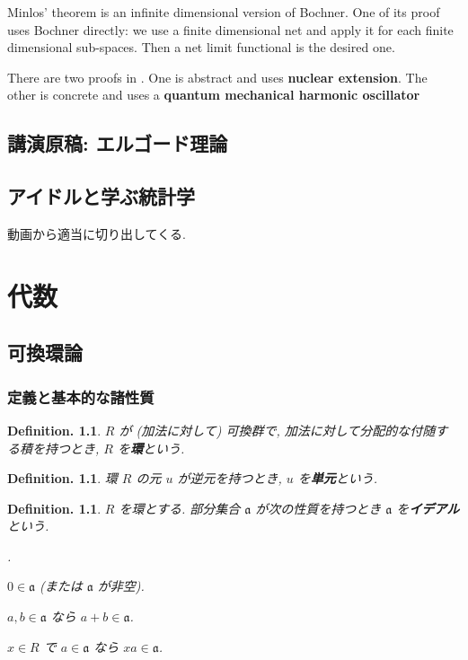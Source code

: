 \documentclass[openany, a4paper, oneside]{jsbook}
\newcounter{enum2}
\renewenvironment{enumerate}{%
\begin{list}%
{%
\arabic{enum2}.\ \,%
}%
{%
\usecounter{enum2}
\setlength{\itemindent}{0pt}%
\setlength{\leftmargin}{15pt}%
\setlength{\rightmargin}{0pt}%
\setlength{\labelsep}{0pt}%
\setlength{\labelwidth}{6pt}%
\setlength{\itemsep}{0pt}%
\setlength{\parsep}{0pt}%
\setlength{\listparindent}{0pt}%
}
}{%
\end{list}%
}
\theoremstyle{break}
\theoremstyle{breakdefn}
\newtheorem{defn}[thm]{Definition.}
\newcommand{\fraka}{\mathfrak{a}}
\begin{document}
Minlos' theorem is an infinite dimensional version of Bochner.
One of its proof uses Bochner directly: we use a finite dimensional net and apply it for each finite dimensional sub-spaces.
Then a net limit functional is the desired one.

There are two proofs in \cite{AsaoArai5}.
One is abstract and uses \textbf{nuclear extension}.
The other is concrete and uses a \textbf{quantum mechanical harmonic oscillator}
\chapter{講演原稿: エルゴード理論}

\chapter{アイドルと学ぶ統計学}


動画から適当に切り出してくる.
\part{代数}

\chapter{可換環論}

\section{定義と基本的な諸性質}


\begin{defn}
 $R$ が (加法に対して) 可換群で, 加法に対して分配的な付随する積を持つとき, $R$ を\textbf{環}という.
\end{defn}
\begin{defn}
 環 $R$ の元 $u$ が逆元を持つとき, $u$ を\textbf{単元}という.
\end{defn}
\begin{defn}
 $R$ を環とする.
 部分集合 $\fraka$ が次の性質を持つとき $\fraka$ を\textbf{イデアル}という.
\begin{enumerate}
\item $0 \in \fraka$ (または $\fraka$ が非空).
\item $a, b \in \fraka$ なら $a + b \in \fraka$.
\item $x \in R$ で $a \in \fraka$ なら $xa \in \fraka$.
\end{enumerate}
\end{defn}
\end{document}
